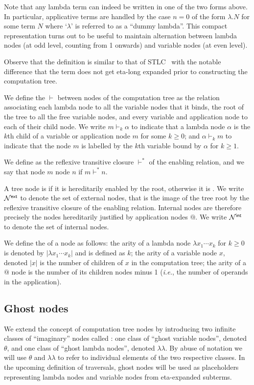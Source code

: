 \documentclass{article}
\makeatletter
\theoremstyle{plain}
\theoremstyle{definition}
\theoremstyle{remark}
\newcommand\Nodes{\mathcal{N}}%
\newcommand{\ghostlmd}{{\lambda\!\!\lambda}}
\newcommand{\ghostvar}{\theta}
\newcommand{\enables}{\vdash} %
\newcommand{\ExtNodes}{\Nodes^{\sf ext}}
\newcommand{\IntNodes}{\Nodes^{\sf int}}
\renewcommand\ie{{\it i.e.\@\xspace}}
\makeatother
\begin{document}
Note that any lambda term can indeed be written in one of the two forms above. In particular, applicative terms are handled by the case $n=0$ of the form $\lambda . N$ for some term $N$ where `$\lambda$' is referred to as a ``dummy lambda''. This compact representation turns out to be useful to maintain alternation between lambda nodes (at odd level, counting from 1 onwards) and variable nodes (at even level).

Observe that the definition is similar to that of STLC~\cite{Ong2006, BlumPhd} with the notable difference that the term does not get eta-long expanded prior to constructing the computation tree.

We define the  $\enables$ between nodes of the computation tree as the relation associating each lambda node to all the variable nodes that it binds, the root of the tree to all the free variable nodes, and every variable and application node to each of their child node. We write $m \enables_k \alpha$ to indicate that a lambda node $\alpha$ is the $k$th child of a variable or application node $m$ for some $k\geq0$; and $\alpha \enables_k m$ to indicate that the node $m$ is labelled by the $k$th variable bound by $\alpha$ for $k\geq1$.

We define  as the reflexive transitive closure $\enables^*$ of the enabling relation, and we say that node $m$  node $n$ if $m \enables^* n$.

A tree node is  if it is hereditarily enabled by the root, otherwise it is . We write $\ExtNodes$ to denote the set of external nodes, that is the image of the tree root by the reflexive transitive closure of the enabling relation. Internal nodes are therefore precisely the nodes hereditarily justified by application nodes $@$. We write $\IntNodes$ to denote the set of internal nodes.

We define the  of a node as follows: the arity of a lambda node $\lambda x_1 \cdots x_k$ for $k\geq 0$ is denoted by $|\lambda x_1 \cdots x_k|$ and is defined as $k$; the arity of a variable node $x$, denoted $|x|$ is the number of children of $x$ in the computation tree; the arity of a $@$ node is the number of its children nodes minus 1 (\ie, the number of operands in the application).

\subsection{Ghost nodes}
We extend the concept of computation tree nodes by introducing two infinite classes of ``imaginary'' nodes called :
one class of ``ghost variable nodes'', denoted $\ghostvar$, and one class of ``ghost lambda nodes'', denoted $\ghostlmd$. By abuse of notation we will use $\ghostvar$ and $\ghostlmd$ to refer to individual elements of the two respective classes. In the upcoming definition of traversals, ghost nodes will be used as placeholders representing lambda nodes and variable nodes from eta-expanded subterms.
\end{document}
